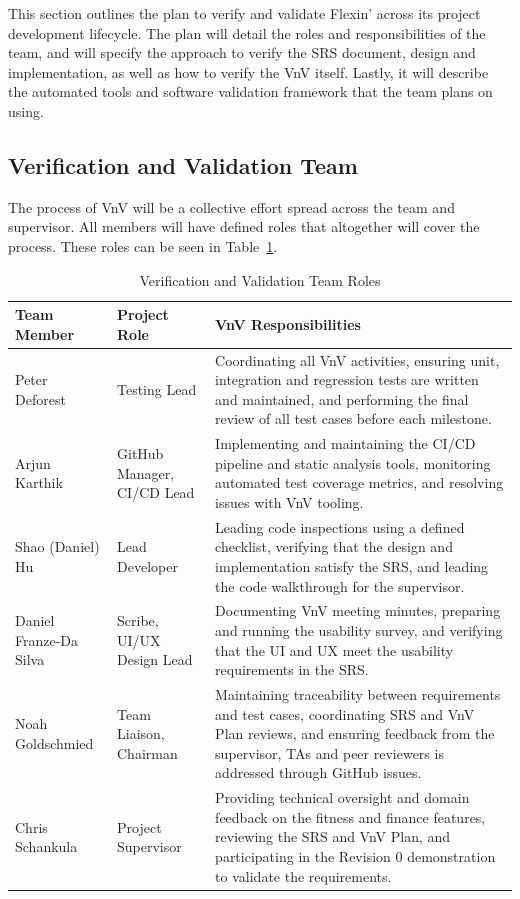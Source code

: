 \documentclass[12pt, titlepage]{article}
\begin{document}
This section outlines the plan to verify and validate Flexin' across its project development lifecycle.
The plan will detail the roles and responsibilities of the team, and will specify the approach to verify the SRS document, design and implementation, as well as how to verify the VnV itself.
Lastly, it will describe the automated tools and software validation framework that the team plans on using.

\subsection{Verification and Validation Team}

The process of VnV will be a collective effort spread across the team and supervisor.
All members will have defined roles that altogether will cover the process.
These roles can be seen in Table~\ref{TblVnVTeamRoles}.

\begin{table}[H]
  \centering
  \caption{Verification and Validation Team Roles}
  \label{TblVnVTeamRoles}
  \begin{tabularx}{\textwidth}{|p{3cm}|p{3cm}|X|}
  \hline
  \textbf{Team Member} & \textbf{Project Role} & \textbf{VnV Responsibilities} \\ \hline
  Peter Deforest & Testing Lead & Coordinating all VnV activities, ensuring unit, integration and regression tests are written and maintained, and performing the final review of all test cases before each milestone. \\ \hline
  Arjun Karthik & GitHub Manager, CI/CD Lead & Implementing and maintaining the CI/CD pipeline and static analysis tools, monitoring automated test coverage metrics, and resolving issues with VnV tooling. \\ \hline
  Shao (Daniel) Hu & Lead Developer & Leading code inspections using a defined checklist, verifying that the design and implementation satisfy the SRS, and leading the code walkthrough for the supervisor. \\ \hline
  Daniel Franze-Da Silva & Scribe, UI/UX Design Lead & Documenting VnV meeting minutes, preparing and running the usability survey, and verifying that the UI and UX meet the usability requirements in the SRS. \\ \hline
  Noah Goldschmied & Team Liaison, Chairman & Maintaining traceability between requirements and test cases, coordinating SRS and VnV Plan reviews, and ensuring feedback from the supervisor, TAs and peer reviewers is addressed through GitHub issues. \\ \hline
  Chris Schankula & Project Supervisor & Providing technical oversight and domain feedback on the fitness and finance features, reviewing the SRS and VnV Plan, and participating in the Revision 0 demonstration to validate the requirements. \\ \hline
  \end{tabularx}
\end{table}
\end{document}
